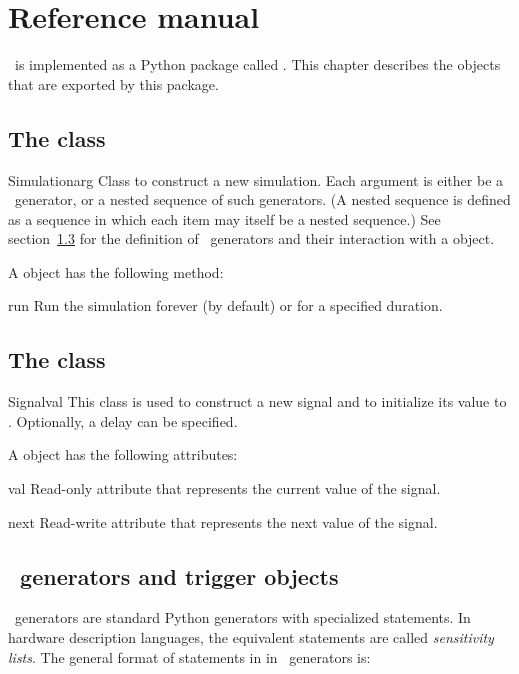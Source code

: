 \chapter{Reference manual}


\myhdl\ is implemented as a Python package called . This
chapter describes the objects that are exported by this package.

\section{The  class}
\begin{classdesc}{Simulation}{arg }
Class to construct a new simulation. Each argument is either be a
\myhdl\ generator, or a nested sequence of such generators. (A nested
sequence is defined as a sequence in which each item may itself be a
nested sequence.) See section~\ref{myhdl-generators} for the
definition of \myhdl\ generators and their interaction with a
 object.
\end{classdesc}

A  object has the following method:

\begin{methoddesc}[Simulation]{run}{}
Run the simulation forever (by default) or for a specified duration.
\end{methoddesc}

\section{The  class}
\label{signal}
\begin{classdesc}{Signal}{val }
This class is used to construct a new signal and to initialize its
value to . Optionally, a delay can be specified.
\end{classdesc}

A  object has the following attributes:

\begin{memberdesc}[Signal]{val}
Read-only attribute that represents the current value of the signal. 
\end{memberdesc}
\begin{memberdesc}[Signal]{next}
Read-write attribute that represents the next value of the signal.
\end{memberdesc}

\section{\myhdl\ generators and trigger objects}
\label{myhdl-generators}
\myhdl\ generators are standard Python generators with specialized
 statements. In hardware description languages, the equivalent
statements are called \emph{sensitivity lists}. The general format
of  statements in in \myhdl\ generators is:

